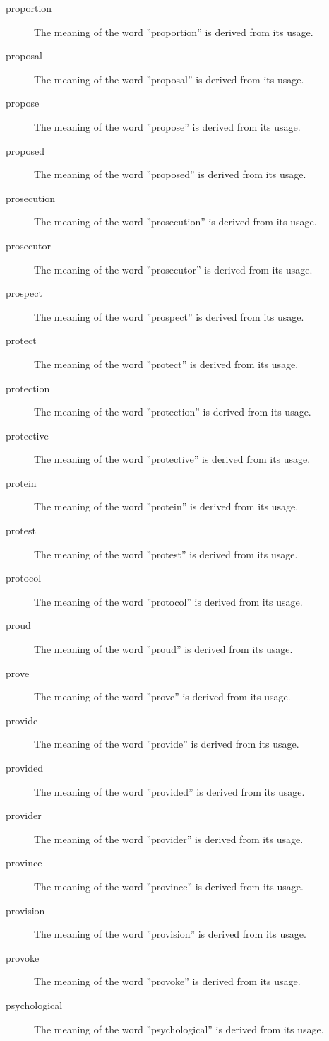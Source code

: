\documentclass[12pt, letterpaper]{memoir}
\begin{document}
\begin{description}
\item[proportion] The meaning of the word ''proportion'' is derived from its usage.
\item[proposal] The meaning of the word ''proposal'' is derived from its usage.
\item[propose] The meaning of the word ''propose'' is derived from its usage.
\item[proposed] The meaning of the word ''proposed'' is derived from its usage.
\item[prosecution] The meaning of the word ''prosecution'' is derived from its usage.
\item[prosecutor] The meaning of the word ''prosecutor'' is derived from its usage.
\item[prospect] The meaning of the word ''prospect'' is derived from its usage.
\item[protect] The meaning of the word ''protect'' is derived from its usage.
\item[protection] The meaning of the word ''protection'' is derived from its usage.
\item[protective] The meaning of the word ''protective'' is derived from its usage.
\item[protein] The meaning of the word ''protein'' is derived from its usage.
\item[protest] The meaning of the word ''protest'' is derived from its usage.
\item[protocol] The meaning of the word ''protocol'' is derived from its usage.
\item[proud] The meaning of the word ''proud'' is derived from its usage.
\item[prove] The meaning of the word ''prove'' is derived from its usage.
\item[provide] The meaning of the word ''provide'' is derived from its usage.
\item[provided] The meaning of the word ''provided'' is derived from its usage.
\item[provider] The meaning of the word ''provider'' is derived from its usage.
\item[province] The meaning of the word ''province'' is derived from its usage.
\item[provision] The meaning of the word ''provision'' is derived from its usage.
\item[provoke] The meaning of the word ''provoke'' is derived from its usage.
\item[psychological] The meaning of the word ''psychological'' is derived from its usage.

\end{description}
\end{document}
